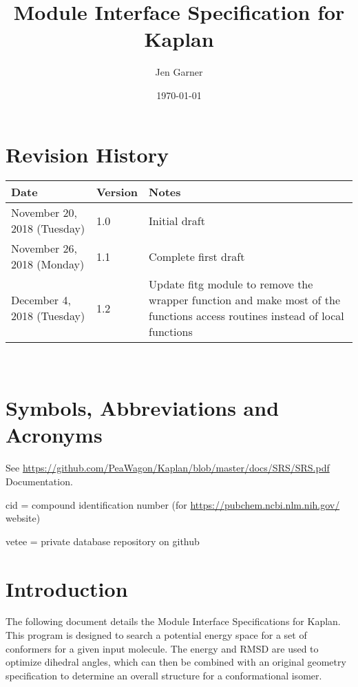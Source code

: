 \documentclass[12pt, titlepage]{article}
\newcommand{\progname}{Kaplan}
\begin{document}
\title{Module Interface Specification for \progname{}}

\author{Jen Garner}

\date{\today}

\maketitle


\section{Revision History}

\begin{tabularx}{\textwidth}{p{3cm}p{2cm}X}
\toprule {\bf Date} & {\bf Version} & {\bf Notes}\\
\midrule
November 20, 2018 (Tuesday) & 1.0 & Initial draft \\
November 26, 2018 (Monday) & 1.1 & Complete first draft \\
December 4, 2018 (Tuesday) & 1.2 & Update fitg module to remove the wrapper 
function and make most of the functions access routines instead of local 
functions \\
\bottomrule
\end{tabularx}

~\newpage

\section{Symbols, Abbreviations and Acronyms}

See \href{SRS}{https://github.com/PeaWagon/Kaplan/blob/master/docs/SRS/SRS.pdf} 
Documentation.

cid = compound identification number (for 
\href{pubchem}{https://pubchem.ncbi.nlm.nih.gov/} website)

vetee = private database repository on github

\newpage

\tableofcontents

\newpage


\section{Introduction}

The following document details the Module Interface Specifications for 
\progname{}. This program is designed to search a potential energy space for a 
set of conformers for a given input molecule. The energy and RMSD are used to 
optimize dihedral angles, which can then be combined with an original geometry 
specification to determine an overall structure for a conformational isomer.
\end{document}
